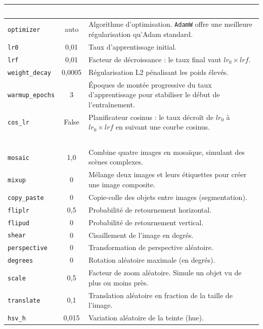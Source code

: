 \begin{longtable}{|l|c|p{8.5cm}|}
  \hline
  \multicolumn{3}{|l|}{\cellcolor{gris_fonce}\textcolor{white}{\textbf{Optimiseur \& taux d'apprentissage}}} \\
  \hline
  \texttt{optimizer} & auto & Algorithme d'optimisation. \texttt{AdamW} offre une meilleure régularisation qu'Adam standard. \\
  \hline
  \texttt{lr0} & 0,01 & Taux d'apprentissage initial. \\
  \hline
  \texttt{lrf} & 0,01 & Facteur de décroissance : le taux final vaut $lr_0 \times lrf$. \\
  \hline
  \texttt{weight\_decay} & 0,0005 & Régularisation L2 pénalisant les poids élevés. \\
  \hline
  \texttt{warmup\_epochs} & 3 & Époques de montée progressive du taux d'apprentissage pour stabiliser le début de l'entraînement. \\
  \hline
  \texttt{cos\_lr} & False & Planificateur cosinus : le taux décroît de $lr_0$ à $lr_0 \times lrf$ en suivant une courbe cosinus. \\
  \hline
  \multicolumn{3}{|l|}{\cellcolor{gris_fonce}\textcolor{white}{\textbf{Augmentation des données}}} \\
  \hline
  \texttt{mosaic} & 1,0 & Combine quatre images en mosaïque, simulant des scènes complexes. \\
  \hline
  \texttt{mixup} & 0 & Mélange deux images et leurs étiquettes pour créer une image composite. \\
  \hline
  \texttt{copy\_paste} & 0 & Copie-colle des objets entre images (segmentation). \\
  \hline
  \texttt{fliplr} & 0,5 & Probabilité de retournement horizontal. \\
  \hline
  \texttt{flipud} & 0 & Probabilité de retournement vertical. \\
  \hline
  \texttt{shear} & 0 & Cisaillement de l'image en degrés. \\
  \hline
  \texttt{perspective} & 0 & Transformation de perspective aléatoire. \\
  \hline
  \texttt{degrees} & 0 & Rotation aléatoire maximale (en degrés). \\
  \hline
  \texttt{scale} & 0,5 & Facteur de zoom aléatoire. Simule un objet vu de plus ou moins près. \\
  \hline
  \texttt{translate} & 0,1 & Translation aléatoire en fraction de la taille de l'image. \\
  \hline
  \texttt{hsv\_h} & 0,015 & Variation aléatoire de la teinte (hue). \\

\end{longtable}

